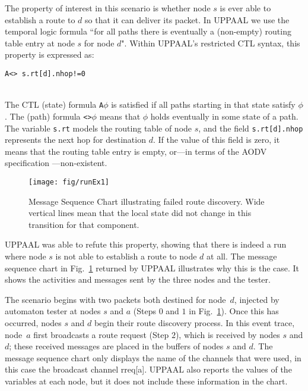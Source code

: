 \documentclass[conference,twoside]{IEEEtran}
\newcommand{\tester}{{\small\sf tester}\xspace}
\begin{document}
The property of interest in this scenario is whether node $s$ is ever able to establish a route to $d$
so that it can deliver its packet. In UPPAAL we use the temporal logic formula
``for all paths there is eventually a (non-empty) routing table
entry at node $s$ for node $d$".
Within UPPAAL's restricted CTL syntax, this property is expressed as:
\\[2mm]\centerline{\tt A<> s.rt[d]\!.nhop!=0}\\[2mm]
The CTL (state) formula {\tt A$\phi$} is satisfied
if all paths starting in that state satisfy $\phi$. The (path)
formula {\tt<>$\phi$} means that $\phi$ holds eventually in some state of a path. The
variable \texttt{s.rt} models the routing table of node $s$, and the field
\texttt{s.rt[d]\!.nhop} represents the next hop for  destination
$d$. If the value of this field is zero, it means that the routing
table entry is empty, or---in terms of the AODV specification \cite{rfc3561}---non-existent.

\begin{figure}[t]
\vspace{4.5pt}\centering
\texttt{[image: fig/runEx1]}
 \caption{Message Sequence Chart illustrating failed route discovery. Wide vertical lines mean that the local state did not change in this transition for that component.}
 \label{fig:event}
 \vspace{-24pt}
\end{figure}

UPPAAL was able to refute this property, showing that there is indeed
a run where node $s$ is not able to establish a route to node $d$ at all.
The message sequence chart in Fig.~\ref{fig:event} returned by UPPAAL illustrates why this is the case.
It shows the activities and messages sent by the three nodes and the \tester{}.\pagebreak


The scenario begins with two packets both destined for node~$d$, injected by automaton {\tester} at nodes $s$ and $a$ (Steps $0$ and $1$ in Fig.~\ref{fig:event}). Once this has occurred, nodes $s$ and $d$ begin their route discovery process. In this event trace, node~$a$ first broadcasts a route request (Step $2$), which is received by nodes $s$ and $d$; these received messages are placed in the buffers of nodes $s$ and $d$. The message sequence chart only displays the name of the channels that were used, in this case the broadcast channel {\small\textsf{rreq[a]}}. UPPAAL also reports the values of the variables at each node, but it does not include these information in the chart.
\end{document}
